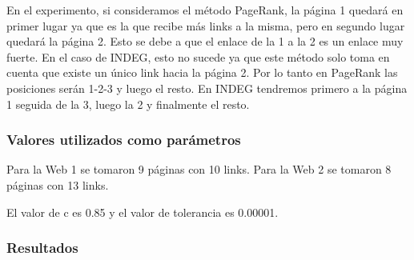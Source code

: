 		En el experimento, si consideramos el método PageRank, la página 1 quedará en primer lugar ya que es la que recibe más links a la misma, pero en segundo lugar quedará la página 2. Esto se debe a que el enlace de la 1 a la 2 es un enlace muy fuerte. En el caso de INDEG, esto no sucede ya que este método solo toma en cuenta que existe un único link hacia la página 2. Por lo tanto en PageRank las posiciones serán 1-2-3 y luego el resto. En INDEG tendremos primero a la página 1 seguida de la 3, luego la 2 y finalmente el resto.

		\subsubsection*{Valores utilizados como parámetros}
		Para la Web 1 se tomaron 9 páginas con 10 links. Para la Web 2 se tomaron 8 páginas con 13 links.  

		El valor de c es 0.85 y el valor de tolerancia es 0.00001. 
		 		

		\subsubsection*{Resultados}


